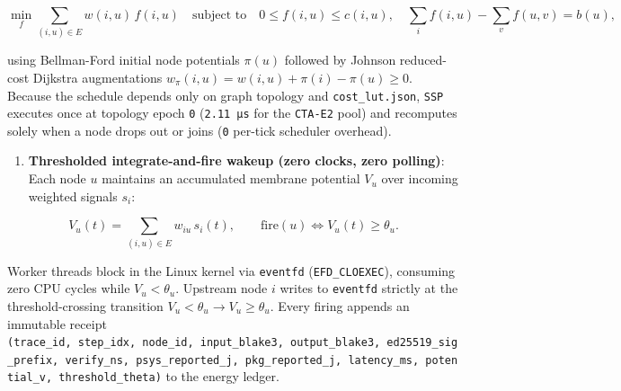 \documentclass[10pt,letterpaper]{article}
\providecommand{\tightlist}{\setlength{\itemsep}{1pt}\setlength{\parskip}{0pt}}
\begin{document}
\[
\min_{f} \sum_{(i, u) \in E} w(i, u)\, f(i, u) \quad \text{subject to} \quad 0 \le f(i, u) \le c(i, u), \quad \sum_{i} f(i, u) - \sum_{v} f(u, v) = b(u),
\]

using Bellman-Ford initial node potentials \(\pi(u)\) followed by
Johnson reduced-cost Dijkstra augmentations
\(w_{\pi}(i, u) = w(i, u) + \pi(i) - \pi(u) \ge 0\). Because the
schedule depends only on graph topology and \texttt{cost\_\allowbreak{}lut.\allowbreak{}json},
\texttt{SSP} executes once at topology epoch \texttt{0}
(\texttt{2.11\ µs} for the \texttt{CTA-E2} pool) and recomputes solely
when a node drops out or joins (\texttt{0} per-tick scheduler overhead).

\begin{enumerate}
\def\labelenumi{\arabic{enumi}.}
\setcounter{enumi}{3}
\tightlist
\item
  \textbf{Thresholded integrate-and-fire wakeup (zero clocks, zero
  polling)}: Each node \(u\) maintains an accumulated membrane potential
  \(V_u\) over incoming weighted signals \(s_i\):
\end{enumerate}

\[
V_u(t) = \sum_{(i, u) \in E} w_{iu}\, s_i(t), \qquad \text{fire}(u) \iff V_u(t) \ge \theta_u.
\]

Worker threads block in the Linux kernel via \texttt{eventfd}
(\texttt{EFD\_\allowbreak{}CLOEXEC}), consuming zero CPU cycles while
\(V_u < \theta_u\). Upstream node \(i\) writes to \texttt{eventfd}
strictly at the threshold-crossing transition
\(V_u < \theta_u \to V_u \ge \theta_u\). Every firing appends an
immutable receipt
\texttt{(\allowbreak{}trace\_\allowbreak{}id,\allowbreak{}\ step\_\allowbreak{}idx,\allowbreak{}\ node\_\allowbreak{}id,\allowbreak{}\ input\_\allowbreak{}blake3,\allowbreak{}\ output\_\allowbreak{}blake3,\allowbreak{}\ ed25519\_\allowbreak{}sig\_\allowbreak{}prefix,\allowbreak{}\ verify\_\allowbreak{}ns,\allowbreak{}\ psys\_\allowbreak{}reported\_\allowbreak{}j,\allowbreak{}\ pkg\_\allowbreak{}reported\_\allowbreak{}j,\allowbreak{}\ latency\_\allowbreak{}ms,\allowbreak{}\ potential\_\allowbreak{}v,\allowbreak{}\ threshold\_\allowbreak{}theta)}
to the energy ledger.
\end{document}
